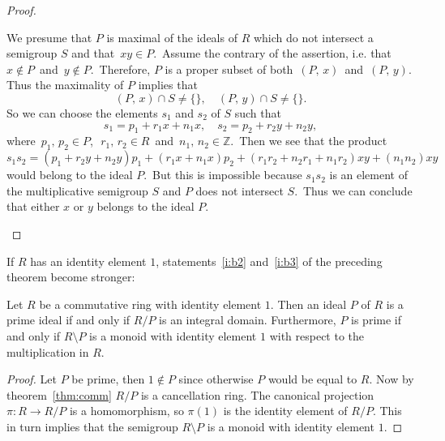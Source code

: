 \documentclass[12pt]{article}
\newcommand{\<}{\langle}
\renewcommand{\>}{\rangle}
\begin{document}
\begin{proof}
\begin{itemize}
We presume that $P$ is maximal of the ideals of $R$ which do not intersect a semigroup $S$ and that\, $xy\in P$.\, Assume the contrary of the assertion, i.e. that\, $x\notin P$\, and\, $y\notin P$.\, Therefore, $P$ is a proper subset of both\, $(P,\,x)$\, and\, $(P,\,y)$.\, Thus the maximality of $P$ implies that
   $$(P,\,x)\cap S \neq\{\}, \quad (P,\,y)\cap S \neq\{\}.$$
So we can choose the elements $s_1$ and $s_2$ of $S$ such that
     $$s_1 = p_1+r_1x+n_1x, \quad s_2 = p_2+r_2y+n_2y,$$
where\, $p_1,\,p_2\in P$,\,\, $r_1,\,r_2\in R$\, and\, $n_1,\,n_2\in \mathbb{Z}$.\, Then we see that the product
$$s_1s_2 = (p_1+r_2y+n_2y)p_1+(r_1x+n_1x)p_2+(r_1r_2+n_2r_1+n_1r_2)xy+(n_1n_2)xy$$
would belong to the ideal $P$.\, But this is impossible because $s_1s_2$ is an element of the multiplicative semigroup $S$ and $P$ does not intersect $S$.\, Thus we can conclude that either $x$ or $y$ belongs to the ideal $P$.

\end{itemize}
\end{proof}



If $R$ has an identity element $1$, statements~\ref{i:b2} and~\ref{i:b3} of
the preceding theorem become stronger:

\begin{thm}
Let $R$ be a commutative ring with identity element $1$. Then an ideal
$P$ of $R$ is a prime ideal if and only if $R/P$ is an integral
domain. Furthermore, $P$ is prime if and only if $R\setminus P$ is a
monoid with identity element $1$ with respect to the multiplication in
$R$.
\end{thm}
\begin{proof}
Let $P$ be prime, then $1\notin P$ since otherwise $P$ would be equal
to $R$. Now by theorem~\ref{thm:comm} $R/P$ is a cancellation
ring. The canonical projection $\pi\colon R\to R/P$ is a homomorphism,
so $\pi(1)$ is the identity element of $R/P$. This in turn implies that
the semigroup $R\setminus P$ is a monoid with identity element $1$.
\end{proof}
\end{document}
